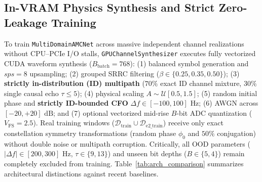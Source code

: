 \subsection{In-VRAM Physics Synthesis and Strict Zero-Leakage Training}
\label{subsec:gpu_synthesizer}

To train \texttt{MultiDomainAMCNet} across massive independent channel realizations without CPU--PCIe I/O stalls, \texttt{GPUChannelSynthesizer} executes fully vectorized CUDA waveform synthesis ($B_{\text{batch}}=768$): (1) balanced symbol generation and $sps=8$ upsampling; (2) grouped SRRC filtering ($\beta \in \{0.25, 0.35, 0.50\}$); (3) \textbf{strictly in-distribution (ID) multipath} ($70\%$ exact ID channel mixture, $30\%$ single causal echo $\tau \le 5$); (4) physical scaling $A \sim \mathcal{U}[0.5, 1.5]$; (5) random initial phase and \textbf{strictly ID-bounded CFO} $\Delta f \in [-100, 100]\text{ Hz}$; (6) AWGN across $[-20, +20]\text{ dB}$; and (7) optional vectorized mid-rise $B$-bit ADC quantization ($V_{\text{FS}} = 2.5$). Real training windows ($\mathcal{D}_{\text{train}} \cup \mathcal{D}_{\text{e2\_train}}$) receive only exact constellation symmetry transformations (random phase $\phi_0$ and $50\%$ conjugation) without double noise or multipath corruption. Critically, all OOD parameters ($|\Delta f| \in [200, 300]\text{ Hz}$, $\tau \in \{9, 13\}$) and unseen bit depths ($B \in \{5, 4\}$) remain completely excluded from training. Table~\ref{tab:arch_comparison} summarizes architectural distinctions against recent baselines.

